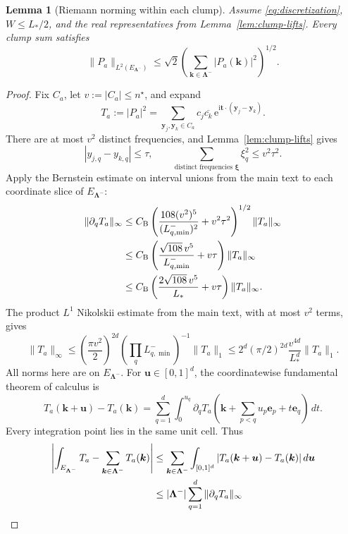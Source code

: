 \documentclass[11pt]{article}
\newtheorem{lemma}{Lemma}
\newcommand{\ii}{\mathrm i}
\begin{document}
\begin{lemma}[Riemann norming within each clump]\label{lem:clump-riemann}
Assume \eqref{eq:discretization}, $W\le L_*/2$, and the real representatives from Lemma~\ref{lem:clump-lifts}. Every clump sum satisfies
\begin{equation}\label{eq:clump-norming}
\|P_a\|_{L^2(E_{\bm\Lambda^-})}\le\sqrt2\left(\sum_{\bm k\in\bm\Lambda^-}|P_a(\bm k)|^2\right)^{1/2}.
\end{equation}
\end{lemma}
\begin{proof}
Fix $C_a$, let $v:=|C_a|\le n^\star$, and expand
\[
T_a:=|P_a|^2=\sum_{\bm y_j,\bm y_k\in C_a}c_j\overline{c_k}\,\mathrm e^{\ii\bm t\cdot(\bm y_j-\bm y_k)}.
\]
There are at most $v^2$ distinct frequencies, and Lemma~\ref{lem:clump-lifts} gives
\[
|y_{j,q}-y_{k,q}|\le\tau,\qquad \sum_{\text{distinct frequencies }\bm\xi}\xi_q^2\le v^2\tau^2.
\]
Apply the Bernstein estimate on interval unions from the main text to each coordinate slice of $E_{\bm\Lambda^-}$:
\begin{align}
\|\partial_qT_a\|_\infty&\le C_{\mathrm B}\left(\frac{108(v^2)^5}{(L_{q,\min}^-)^2}+v^2\tau^2\right)^{1/2}\|T_a\|_\infty\notag\\
&\le C_{\mathrm B}\left(\frac{\sqrt{108}\,v^5}{L_{q,\min}^-}+v\tau\right)\|T_a\|_\infty\notag\\
&\le C_{\mathrm B}\left(\frac{2\sqrt{108}\,v^5}{L_*}+v\tau\right)\|T_a\|_\infty.\label{eq:derivative-clump}
\end{align}
The product $L^1$ Nikolskii estimate from the main text, with at most $v^2$ terms, gives
\begin{equation}\label{eq:sup-clump}
\|T_a\|_\infty\le\left(\frac{\pi v^2}{2}\right)^{2d}\left(\prod_qL_{q,\min}^-\right)^{-1}\|T_a\|_1\le2^d(\pi/2)^{2d}\frac{v^{4d}}{L_*^d}\|T_a\|_1.
\end{equation}
All norms here are on $E_{\bm\Lambda^-}$. For $\bm u\in[0,1]^d$, the coordinatewise fundamental theorem of calculus is
\[
T_a(\bm k+\bm u)-T_a(\bm k)=\sum_{q=1}^d\int_0^{u_q}\partial_qT_a\left(\bm k+\sum_{p<q}u_p\bm e_p+t\bm e_q\right)\,dt.
\]
Every integration point lies in the same unit cell. Thus
\begin{align}
\left|\int_{E_{\bm\Lambda^-}}T_a-\sum_{\bm k\in\bm\Lambda^-}T_a(\bm k)\right|&\le\sum_{\bm k\in\bm\Lambda^-}\int_{[0,1]^d}|T_a(\bm k+\bm u)-T_a(\bm k)|\,d\bm u\notag\\
&\le|\bm\Lambda^-|\sum_{q=1}^d\|\partial_qT_a\|_\infty\notag\\

\end{align}
\end{proof}
\end{document}

